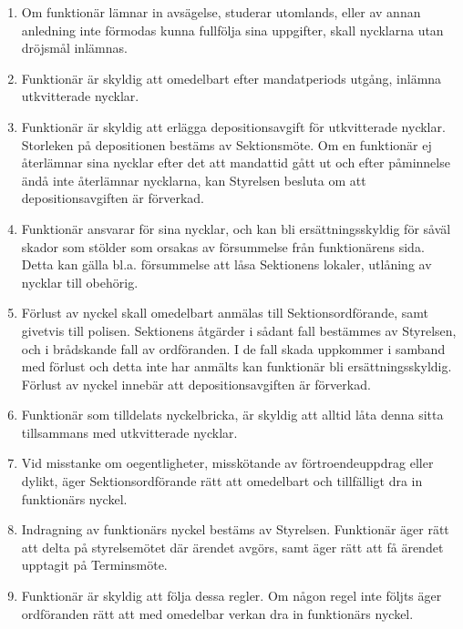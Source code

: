 \documentclass[10pt]{article}
\begin{document}
\begin{enumerate}[label=\S\arabic*.]
  \item Om funktionär lämnar in avsägelse, studerar utomlands, eller av annan anledning inte förmodas kunna fullfölja sina uppgifter, skall nycklarna utan dröjsmål inlämnas.
  \item Funktionär är skyldig att omedelbart efter mandatperiods utgång, inlämna utkvitterade nycklar.
  \item Funktionär är skyldig att erlägga depositionsavgift för utkvitterade nycklar. Storleken på depositionen bestäms av Sektionsmöte. Om en funktionär ej återlämnar sina nycklar efter det att mandattid gått ut och efter påminnelse ändå inte återlämnar nycklarna, kan Styrelsen besluta om att depositionsavgiften är förverkad.
  \item Funktionär ansvarar för sina nycklar, och kan bli ersättningsskyldig för såväl skador som stölder som orsakas av försummelse från funktionärens sida. Detta kan gälla bl.a. försummelse att låsa Sektionens lokaler, utlåning av nycklar till obehörig.
  \item Förlust av nyckel skall omedelbart anmälas till Sektionsordförande, samt givetvis till polisen. Sektionens åtgärder i sådant fall bestämmes av Styrelsen, och i brådskande fall av ordföranden. I de fall skada uppkommer i samband med förlust och detta inte har anmälts kan funktionär bli ersättningsskyldig. Förlust av nyckel innebär att depositionsavgiften är förverkad.
  \item Funktionär som tilldelats nyckelbricka, är skyldig att alltid låta denna sitta tillsammans med utkvitterade nycklar.
  \item Vid misstanke om oegentligheter, misskötande av förtroendeuppdrag eller dylikt, äger Sektionsordförande rätt att omedelbart och tillfälligt dra in funktionärs nyckel.
  \item Indragning av funktionärs nyckel bestäms av Styrelsen. Funktionär äger rätt att delta på styrelsemötet där ärendet avgörs, samt äger rätt att få ärendet upptagit på Terminsmöte.
  \item Funktionär är skyldig att följa dessa regler. Om någon regel inte följts äger ordföranden rätt att med omedelbar verkan dra in funktionärs nyckel.
\end{enumerate}
\end{document}
